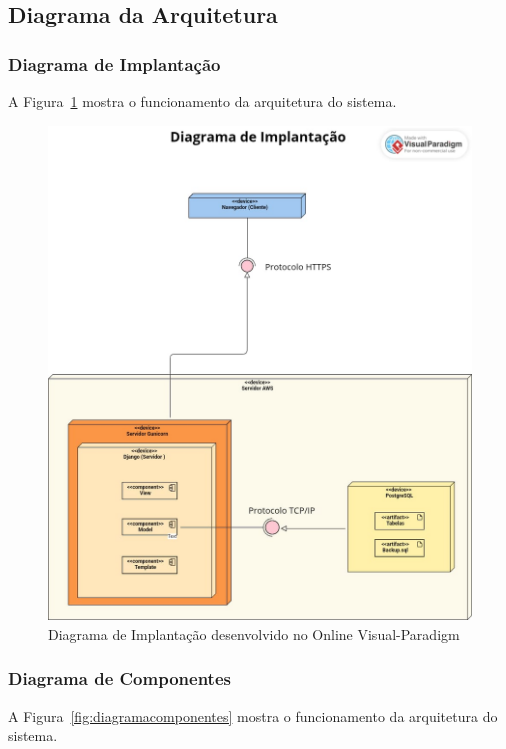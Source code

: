 \documentclass[
	12pt,				%
	openany,			%
	twoside,			%
	a4paper,			%
	english,			%
	french,				%
	spanish,			%
	brazil				%
	]{abntex2}
\begin{document}
\subsection{Diagrama da Arquitetura}
\subsubsection{Diagrama de Implantação}
A Figura~\ref{fig:diagramaimplantação} mostra o funcionamento da arquitetura do sistema.

\begin{figure}[H]
	\centering
	\includegraphics[width=\textwidth]{Diagrama de Implantação- Digitalização da Pousada.JPEG}
	\caption{Diagrama de Implantação desenvolvido no Online Visual-Paradigm}
	\label{fig:diagramaimplantação}
\end{figure}
\subsubsection{Diagrama de Componentes}
A Figura~\ref{fig:diagramacomponentes} mostra o funcionamento da arquitetura do sistema.
\end{document}
